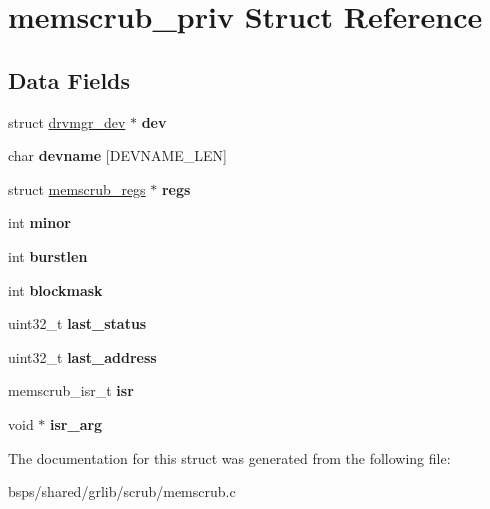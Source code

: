\hypertarget{structmemscrub__priv}{}\section{memscrub\+\_\+priv Struct Reference}
\label{structmemscrub__priv}
\subsection*{Data Fields}
\begin{DoxyCompactItemize}
\item 
\mbox{\label{structmemscrub__priv_a42c2fadc4fc5a334b2269266c811aa4e}} 
struct \mbox{\hyperlink{structdrvmgr__dev}{drvmgr\+\_\+dev}} $\ast$ {\bfseries dev}
\item 
\mbox{\label{structmemscrub__priv_afeb50c0500cc4113ed00bc433dcedbb5}} 
char {\bfseries devname} \mbox{[}D\+E\+V\+N\+A\+M\+E\+\_\+\+L\+EN\mbox{]}
\item 
\mbox{\label{structmemscrub__priv_a7c812741d137204b9bd66d885a217542}} 
struct \mbox{\hyperlink{structmemscrub__regs}{memscrub\+\_\+regs}} $\ast$ {\bfseries regs}
\item 
\mbox{\label{structmemscrub__priv_a626360eff090fb08608e7f4d00208148}} 
int {\bfseries minor}
\item 
\mbox{\label{structmemscrub__priv_aba81295bd44faf006d5599ee7cd4c8d1}} 
int {\bfseries burstlen}
\item 
\mbox{\label{structmemscrub__priv_ac5d60e191b3e9ba625baffae5a66f99e}} 
int {\bfseries blockmask}
\item 
\mbox{\label{structmemscrub__priv_a7e5603e15d20361f296de5a9b1c57402}} 
uint32\+\_\+t {\bfseries last\+\_\+status}
\item 
\mbox{\label{structmemscrub__priv_a4bc0e0e7473796be5f91cd758792920d}} 
uint32\+\_\+t {\bfseries last\+\_\+address}
\item 
\mbox{\label{structmemscrub__priv_ab00247f85608ad2d23de438d6458d9e0}} 
memscrub\+\_\+isr\+\_\+t {\bfseries isr}
\item 
\mbox{\label{structmemscrub__priv_a5f1d1cf851b69bccf4c75576e6d777ac}} 
void $\ast$ {\bfseries isr\+\_\+arg}
\end{DoxyCompactItemize}


The documentation for this struct was generated from the following file\+:\begin{DoxyCompactItemize}
\item 
bsps/shared/grlib/scrub/memscrub.\+c\end{DoxyCompactItemize}
